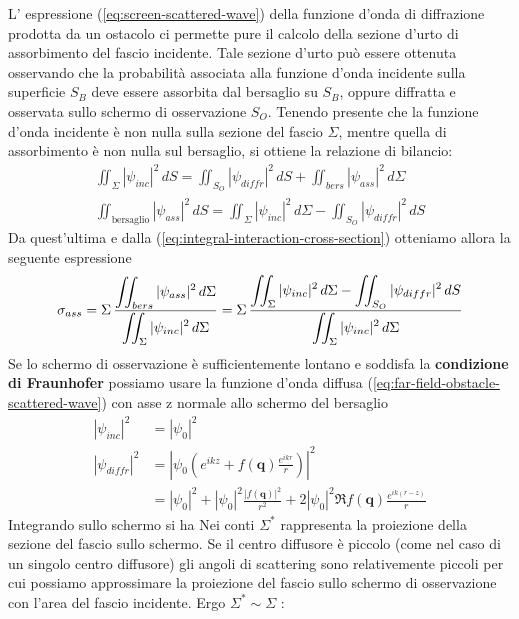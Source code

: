 L' espressione (\ref{eq:screen-scattered-wave}) della funzione d'onda di diffrazione prodotta da un ostacolo ci permette pure il calcolo della sezione d'urto di assorbimento del fascio incidente.
Tale sezione d'urto può essere ottenuta osservando che la probabilità associata alla funzione d'onda incidente sulla superficie $S_B$ deve essere assorbita dal bersaglio su $S_B$, oppure diffratta e osservata sullo schermo di osservazione $S_O$.
Tenendo presente che la funzione d'onda incidente è non nulla sulla sezione del fascio $\Sigma$, mentre quella di assorbimento è non nulla sul bersaglio, si ottiene la relazione di bilancio:
\begin{gather*}
	\iint_{\Sigma} |\psi_{inc}|^2 \, dS =
	\iint_{S_O} |\psi_{diffr}|^2 \, dS +
	\iint_{bers} |\psi_{ass}|^2 \, d \Sigma\\
	\iint_{\text{bersaglio}} |\psi_{ass}|^2 \, dS =
	\iint_{\Sigma} |\psi_{inc}|^2 \, d\Sigma -
	\iint_{S_O} |\psi_{diffr}|^2 \, dS
\end{gather*}
Da quest'ultima e dalla (\ref{eq:integral-interaction-cross-section}) otteniamo allora la seguente espressione
\[
	\sigma_{ass} =\Sigma \, \fraclarg{\iint_{bers} |\psi_{ass}|^2 \, d \Sigma}{\iint_{\Sigma} |\psi_{inc}|^2 \, d \Sigma}
	= \Sigma \, \fraclarg{\iint_{\Sigma} |\psi_{inc}|^2 \, d\Sigma -
		\iint_{S_O} |\psi_{diffr}|^2 \, dS}{\iint_{\Sigma} |\psi_{inc}|^2 \, d \Sigma}
\]
Se lo schermo di osservazione è sufficientemente lontano e soddisfa la \textbf{condizione di Fraunhofer} possiamo usare la
funzione d'onda diffusa (\ref{eq:far-field-obstacle-scattered-wave}) con asse z normale allo schermo del bersaglio
\begin{align*}
	|\psi_{inc}|^2   & = |\psi_0|^2                                                                                           \\
	|\psi_{diffr}|^2 & = \left | \psi_0 \left( e^{ikz} + f(\bm{q})\frac{e^{ikr}}{r} \right) \right|^2                         \\
	                 & =  |\psi_0|^2 + |\psi_0|^2 \frac{|f(\bm{q})|^2}{r^2} + 2 |\psi_0|^2 \Re f(\bm{q})\frac{e^{ik(r-z)}}{r}
\end{align*}
Integrando sullo schermo si ha\sidenote
{
	Nei conti $ \Sigma^*$ rappresenta la proiezione della sezione del fascio sullo schermo. Se il centro diffusore è piccolo
	(come nel caso di un singolo centro diffusore) gli angoli di scattering sono relativemente piccoli per cui
 possiamo approssimare la proiezione del fascio sullo schermo di osservazione con l’area del fascio incidente.
Ergo $ \Sigma^* \sim \Sigma$
}:
